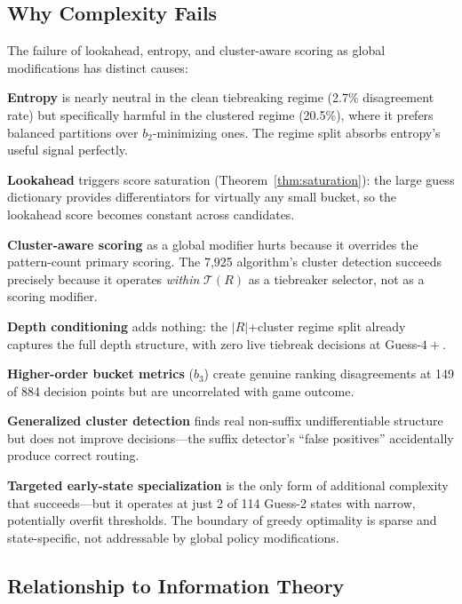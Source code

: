 \documentclass[11pt]{article}
\begin{document}
	\subsection{Why Complexity Fails}
	
	The failure of lookahead, entropy, and cluster-aware scoring as global modifications has distinct causes:
	
	\textbf{Entropy} is nearly neutral in the clean tiebreaking regime (2.7\% disagreement rate) but specifically harmful in the clustered regime (20.5\%), where it prefers balanced partitions over $b_2$-minimizing ones.  The regime split absorbs entropy's useful signal perfectly.
	
	\textbf{Lookahead} triggers score saturation (Theorem~\ref{thm:saturation}): the large guess dictionary provides differentiators for virtually any small bucket, so the lookahead score becomes constant across candidates.
	
	\textbf{Cluster-aware scoring} as a global modifier hurts because it overrides the pattern-count primary scoring.  The 7,925 algorithm's cluster detection succeeds precisely because it operates \emph{within} $\mathcal{T}(R)$ as a tiebreaker selector, not as a scoring modifier.
	
	\textbf{Depth conditioning} adds nothing: the $|R|$+cluster regime split already captures the full depth structure, with zero live tiebreak decisions at Guess-$4{+}$.
	
	\textbf{Higher-order bucket metrics} ($b_3$) create genuine ranking disagreements at 149 of 884 decision points but are uncorrelated with game outcome.
	
	\textbf{Generalized cluster detection} finds real non-suffix undifferentiable structure but does not improve decisions---the suffix detector's ``false positives'' accidentally produce correct routing.
	
	\textbf{Targeted early-state specialization} is the only form of additional complexity that succeeds---but it operates at just 2 of 114 Guess-2 states with narrow, potentially overfit thresholds.  The boundary of greedy optimality is sparse and state-specific, not addressable by global policy modifications.
	
	\subsection{Relationship to Information Theory}
	
\end{document}

